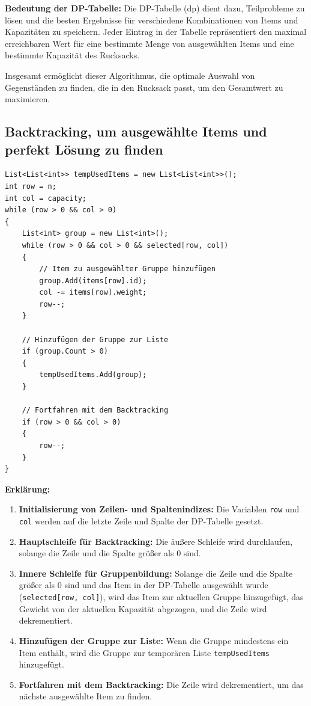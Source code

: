 \textbf{Bedeutung der DP-Tabelle:}
Die DP-Tabelle (dp) dient dazu, Teilprobleme zu lösen und die besten Ergebnisse für verschiedene Kombinationen
von Items und Kapazitäten zu speichern. Jeder Eintrag in der Tabelle repräsentiert den maximal erreichbaren Wert
für eine bestimmte Menge von ausgewählten Items und eine bestimmte Kapazität des Rucksacks.

Insgesamt ermöglicht dieser Algorithmus, die optimale Auswahl von Gegenständen zu finden, die in den Rucksack
passt, um den Gesamtwert zu maximieren.


\subsection*{Backtracking, um ausgewählte Items und perfekt Lösung zu finden}
\begin{lstlisting}[style=csharp, caption={}, label=code:backtrack]
List<List<int>> tempUsedItems = new List<List<int>>();
int row = n;
int col = capacity;
while (row > 0 && col > 0)
{
    List<int> group = new List<int>();
    while (row > 0 && col > 0 && selected[row, col])
    {
        // Item zu ausgewählter Gruppe hinzufügen
        group.Add(items[row].id);
        col -= items[row].weight;
        row--;
    }

    // Hinzufügen der Gruppe zur Liste
    if (group.Count > 0)
    {
        tempUsedItems.Add(group);
    }

    // Fortfahren mit dem Backtracking
    if (row > 0 && col > 0)
    {
        row--;
    }
}
\end{lstlisting}

\textbf{Erklärung:}
\begin{enumerate}
    \item \textbf{Initialisierung von Zeilen- und Spaltenindizes:} Die Variablen \texttt{row} und \texttt{col} werden auf die letzte Zeile und Spalte der DP-Tabelle gesetzt.

    \item \textbf{Hauptschleife für Backtracking:} Die äußere Schleife wird durchlaufen, solange die Zeile und die Spalte größer als 0 sind.

    \item \textbf{Innere Schleife für Gruppenbildung:} Solange die Zeile und die Spalte größer als 0 sind und das Item in der DP-Tabelle ausgewählt wurde (\texttt{selected[row, col]}), wird das Item zur aktuellen Gruppe hinzugefügt, das Gewicht von der aktuellen Kapazität abgezogen, und die Zeile wird dekrementiert.

    \item \textbf{Hinzufügen der Gruppe zur Liste:} Wenn die Gruppe mindestens ein Item enthält, wird die Gruppe zur temporären Liste \texttt{tempUsedItems} hinzugefügt.

    \item \textbf{Fortfahren mit dem Backtracking:} Die Zeile wird dekrementiert, um das nächste ausgewählte Item zu finden.
\end{enumerate}

